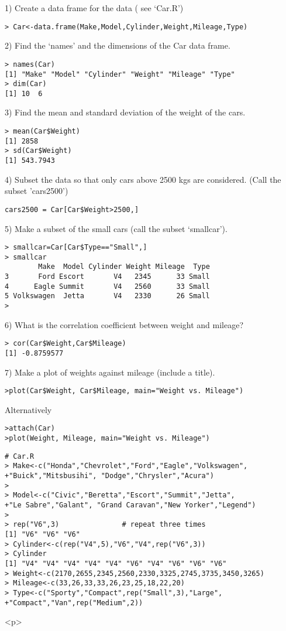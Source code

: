 1) Create a data frame for the data ( see `Car.R')
\begin{verbatim}
> Car<-data.frame(Make,Model,Cylinder,Weight,Mileage,Type)
\end{verbatim}

2) Find the `names' and the dimensions of the Car data frame.
\begin{verbatim}
> names(Car)
[1] "Make" "Model" "Cylinder" "Weight" "Mileage" "Type"
> dim(Car)
[1] 10  6
\end{verbatim}

3) Find the mean and standard deviation of the weight of the cars.
\begin{verbatim}
> mean(Car$Weight)
[1] 2858
> sd(Car$Weight)
[1] 543.7943
\end{verbatim}

4) Subset the data so that only cars above 2500 kgs are considered. (Call the subset 'cars2500')
\begin{verbatim}
cars2500 = Car[Car$Weight>2500,]
\end{verbatim}

5) Make a subset of the small cars (call the subset `smallcar').
\begin{verbatim}
> smallcar=Car[Car$Type=="Small",]
> smallcar
        Make  Model Cylinder Weight Mileage  Type
3       Ford Escort       V4   2345      33 Small
4      Eagle Summit       V4   2560      33 Small
5 Volkswagen  Jetta       V4   2330      26 Small
>
\end{verbatim}

6) What is the correlation coefficient between weight and mileage?

\begin{verbatim}
> cor(Car$Weight,Car$Mileage)
[1] -0.8759577
\end{verbatim}

7) Make a plot of weights against mileage (include a title).

\begin{verbatim}
>plot(Car$Weight, Car$Mileage, main="Weight vs. Mileage")
\end{verbatim}

Alternatively
\begin{verbatim}
>attach(Car)
>plot(Weight, Mileage, main="Weight vs. Mileage")
\end{verbatim}

\newpage


\newpage

\begin{verbatim}
# Car.R
> Make<-c("Honda","Chevrolet","Ford","Eagle","Volkswagen",
+"Buick","Mitsbusihi", "Dodge","Chrysler","Acura")
>
> Model<-c("Civic","Beretta","Escort","Summit","Jetta",
+"Le Sabre","Galant", "Grand Caravan","New Yorker","Legend")
>
> rep("V6",3)               # repeat three times
[1] "V6" "V6" "V6"
> Cylinder<-c(rep("V4",5),"V6","V4",rep("V6",3))
> Cylinder
[1] "V4" "V4" "V4" "V4" "V4" "V6" "V4" "V6" "V6" "V6"
> Weight<-c(2170,2655,2345,2560,2330,3325,2745,3735,3450,3265)
> Mileage<-c(33,26,33,33,26,23,25,18,22,20)
> Type<-c("Sporty","Compact",rep("Small",3),"Large",
+"Compact","Van",rep("Medium",2))
\end{verbatim}

<p>
